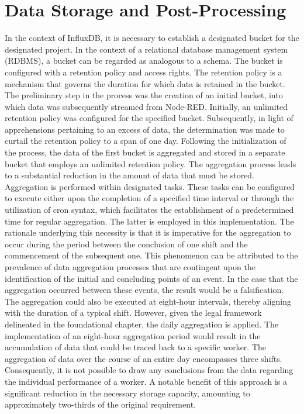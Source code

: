 \section{Data Storage and Post-Processing}
In the context of InfluxDB, it is necessary to establish a designated bucket for the designated project. In the context of a relational database management system (RDBMS), a bucket can be regarded as analogous to a schema. The bucket is configured with a retention policy and access rights. The retention policy is a mechanism that governs the duration for which data is retained in the bucket. The preliminary step in the process was the creation of an initial bucket, into which data was subsequently streamed from Node-RED. Initially, an unlimited retention policy was configured for the specified bucket. Subsequently, in light of apprehensions pertaining to an excess of data, the determination was made to curtail the retention policy to a span of one day. Following the initialization of the process, the data of the first bucket is aggregated and stored in a separate bucket that employs an unlimited retention policy. The aggregation process leads to a substantial reduction in the amount of data that must be stored. Aggregation is performed within designated tasks. These tasks can be configured to execute either upon the completion of a specified time interval or through the utilization of cron syntax, which facilitates the establishment of a predetermined time for regular aggregation. The latter is employed in this implementation. The rationale underlying this necessity is that it is imperative for the aggregation to occur during the period between the conclusion of one shift and the commencement of the subsequent one. This phenomenon can be attributed to the prevalence of data aggregation processes that are contingent upon the identification of the initial and concluding points of an event. In the case that the aggregation occurred between these events, the result would be a falsification. The aggregation could also be executed at eight-hour intervals, thereby aligning with the duration of a typical shift. However, given the legal framework delineated in the foundational chapter, the daily aggregation is applied. The implementation of an eight-hour aggregation period would result in the accumulation of data that could be traced back to a specific worker. The aggregation of data over the course of an entire day encompasses three shifts. Consequently, it is not possible to draw any conclusions from the data regarding the individual performance of a worker. A notable benefit of this approach is a significant reduction in the necessary storage capacity, amounting to approximately two-thirds of the original requirement.
